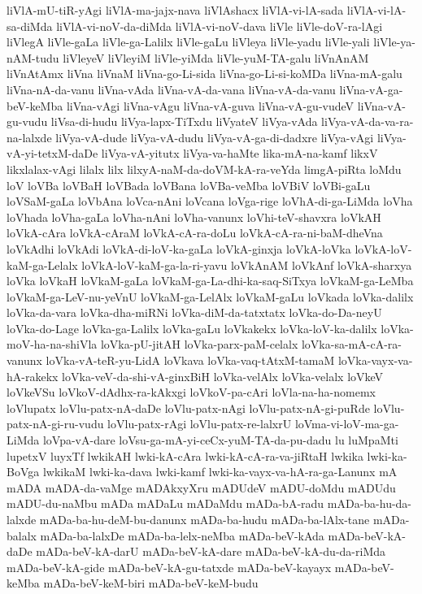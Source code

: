 {liVlA-mU-tiR-yAgi
liVlA-ma-jajx-nava
liVlAshacx
liVlA-vi-lA-sada
liVlA-vi-lA-sa-diMda
liVlA-vi-noV-da-diMda
liVlA-vi-noV-dava
liVle
liVle-doV-ra-lAgi
liVlegA
liVle-gaLa
liVle-ga-Lalilx
liVle-gaLu
liVleya
liVle-yadu
liVle-yali
liVle-ya-nAM-tudu
liVleyeV
liVleyiM
liVle-yiMda
liVle-yuM-TA-galu
liVnAnAM
liVnAtAmx
liVna
liVnaM
liVna-go-Li-sida
liVna-go-Li-si-koMDa
liVna-mA-galu
liVna-nA-da-vanu
liVna-vAda
liVna-vA-da-vana
liVna-vA-da-vanu
liVna-vA-ga-beV-keMba
liVna-vAgi
liVna-vAgu
liVna-vA-guva
liVna-vA-gu-vudeV
liVna-vA-gu-vudu
liVsa-di-hudu
liVya-lapx-TiTxdu
liVyateV
liVya-vAda
liVya-vA-da-va-ra-na-lalxde
liVya-vA-dude
liVya-vA-dudu
liVya-vA-ga-di-dadxre
liVya-vAgi
liVya-vA-yi-tetxM-daDe
liVya-vA-yitutx
liVya-va-haMte
lika-mA-na-kamf
likxV
likxlalax-vAgi
lilalx
lilx
lilxyA-naM-da-doVM-kA-ra-veYda
limgA-piRta
loMdu
loV
loVBa
loVBaH
loVBada
loVBana
loVBa-veMba
loVBiV
loVBi-gaLu
loVSaM-gaLa
loVbAna
loVca-nAni
loVcana
loVga-rige
loVhA-di-ga-LiMda
loVha
loVhada
loVha-gaLa
loVha-nAni
loVha-vanunx
loVhi-teV-shavxra
loVkAH
loVkA-cAra
loVkA-cAraM
loVkA-cA-ra-doLu
loVkA-cA-ra-ni-baM-dheVna
loVkAdhi
loVkAdi
loVkA-di-loV-ka-gaLa
loVkA-ginxja
loVkA-loVka
loVkA-loV-kaM-ga-Lelalx
loVkA-loV-kaM-ga-la-ri-yavu
loVkAnAM
loVkAnf
loVkA-sharxya
loVka
loVkaH
loVkaM-gaLa
loVkaM-ga-La-dhi-ka-saq-SiTxya
loVkaM-ga-LeMba
loVkaM-ga-LeV-nu-yeVnU
loVkaM-ga-LelAlx
loVkaM-gaLu
loVkada
loVka-dalilx
loVka-da-vara
loVka-dha-miRNi
loVka-diM-da-tatxtatx
loVka-do-Da-neyU
loVka-do-Lage
loVka-ga-Lalilx
loVka-gaLu
loVkakekx
loVka-loV-ka-dalilx
loVka-moV-ha-na-shiVla
loVka-pU-jitAH
loVka-parx-paM-celalx
loVka-sa-mA-cA-ra-vanunx
loVka-vA-teR-yu-LidA
loVkava
loVka-vaq-tAtxM-tamaM
loVka-vayx-va-hA-rakekx
loVka-veV-da-shi-vA-ginxBiH
loVka-velAlx
loVka-velalx
loVkeV
loVkeVSu
loVkoV-dAdhx-ra-kAkxgi
loVkoV-pa-cAri
loVla-na-ha-nomemx
loVlupatx
loVlu-patx-nA-daDe
loVlu-patx-nAgi
loVlu-patx-nA-gi-puRde
loVlu-patx-nA-gi-ru-vudu
loVlu-patx-rAgi
loVlu-patx-re-lalxrU
loVma-vi-loV-ma-ga-LiMda
loVpa-vA-dare
loVsu-ga-mA-yi-ceCx-yuM-TA-da-pu-dadu
lu
luMpaMti
lupetxV
luyxTf
lwkikAH
lwki-kA-cAra
lwki-kA-cA-ra-va-jiRtaH
lwkika
lwki-ka-BoVga
lwkikaM
lwki-ka-dava
lwki-kamf
lwki-ka-vayx-va-hA-ra-ga-Lanunx
mA
mADA
mADA-da-vaMge
mADAkxyXru
mADUdeV
mADU-doMdu
mADUdu
mADU-du-naMbu
mADa
mADaLu
mADaMdu
mADa-bA-radu
mADa-ba-hu-da-lalxde
mADa-ba-hu-deM-bu-danunx
mADa-ba-hudu
mADa-ba-lAlx-tane
mADa-balalx
mADa-ba-lalxDe
mADa-ba-lelx-neMba
mADa-beV-kAda
mADa-beV-kA-daDe
mADa-beV-kA-darU
mADa-beV-kA-dare
mADa-beV-kA-du-da-riMda
mADa-beV-kA-gide
mADa-beV-kA-gu-tatxde
mADa-beV-kayayx
mADa-beV-keMba
mADa-beV-keM-biri
mADa-beV-keM-budu
}
